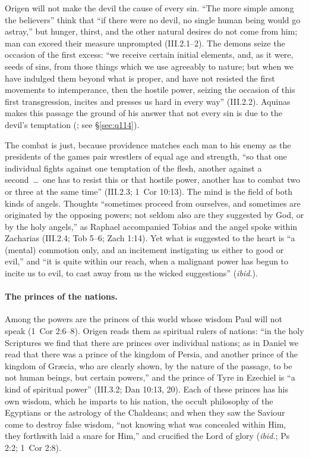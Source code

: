 Origen will not make the devil the cause of every sin. ``The more simple
among the believers'' think that ``if there were no devil, no single human
being would go astray,'' but hunger, thirst, and the other natural desires
do not come from him; man can exceed their measure unprompted (III.2.1--2).
The demons seize the occasion of the first excess: ``we receive certain
initial elements, and, as it were, seeds of sins, from those things which
we use agreeably to nature; but when we have indulged them beyond what is
proper, and have not resisted the first movements to intemperance, then the
hostile power, seizing the occasion of this first transgression, incites
and presses us hard in every way'' (III.2.2). Aquinas makes this passage
the ground of his answer that not every sin is due to the devil's
temptation (; see \S\ref{sec:q114}).

The combat is just, because providence matches each man to his enemy as
the presidents of the games pair wrestlers of equal age and strength, ``so
that one individual fights against one temptation of the flesh, another
against a second~\dots\ one has to resist this or that hostile power,
another has to combat two or three at the same time'' (III.2.3; 1~Cor
10:13). The mind is the field of both kinds of angels. Thoughts
``sometimes proceed from ourselves, and sometimes are originated by the
opposing powers; not seldom also are they suggested by God, or by the holy
angels,'' as Raphael accompanied Tobias and the angel spoke within
Zacharias (III.2.4; Tob 5--6; Zach 1:14). Yet what is suggested to the heart is ``a
(mental) commotion only, and an incitement instigating us either to good or
evil,'' and ``it is quite within our reach, when a malignant power has begun
to incite us to evil, to cast away from us the wicked suggestions''
(\emph{ibid.}).

\paragraph{The princes of the nations.} Among the powers are the princes of
this world whose wisdom Paul will not speak (1~Cor 2:6--8). Origen reads
them as spiritual rulers of nations: ``in the holy Scriptures we find that
there are princes over individual nations; as in Daniel we read that there
was a prince of the kingdom of Persia, and another prince of the kingdom of
Gr\ae cia, who are clearly shown, by the nature of the passage, to be not
human beings, but certain powers,'' and the prince of Tyre in Ezechiel is
``a kind of spiritual power'' (III.3.2; Dan 10:13, 20). Each of these
princes has his own wisdom, which he imparts to his nation, the occult
philosophy of the Egyptians or the astrology of the Chaldeans; and when
they saw the Saviour come to destroy false wisdom, ``not knowing what was
concealed within Him, they forthwith laid a snare for Him,'' and crucified
the Lord of glory (\emph{ibid.}; Ps 2:2; 1~Cor 2:8).

